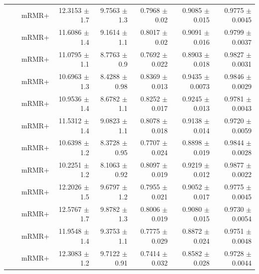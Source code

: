 \begin{longtable}{llp{}rrrrr}
 &  & mRMR+ & 12.3153 {\scriptsize $\pm$ 1.7} & 9.7563 {\scriptsize $\pm$ 1.3} & 0.7968 {\scriptsize $\pm$ 0.02} & 0.9085 {\scriptsize $\pm$ 0.015} & 0.9775 {\scriptsize $\pm$ 0.0045} \\
 &  & mRMR+ & 11.6086 {\scriptsize $\pm$ 1.4} & 9.1614 {\scriptsize $\pm$ 1.1} & 0.8017 {\scriptsize $\pm$ 0.02} & 0.9091 {\scriptsize $\pm$ 0.016} & 0.9799 {\scriptsize $\pm$ 0.0037} \\
 &  & mRMR+ & 11.0795 {\scriptsize $\pm$ 1.1} & 8.7763 {\scriptsize $\pm$ 0.9} & 0.7692 {\scriptsize $\pm$ 0.022} & 0.8903 {\scriptsize $\pm$ 0.018} & 0.9827 {\scriptsize $\pm$ 0.0031} \\
 &  & mRMR+ & 10.6963 {\scriptsize $\pm$ 1.3} & 8.4288 {\scriptsize $\pm$ 0.98} & 0.8369 {\scriptsize $\pm$ 0.013} & 0.9435 {\scriptsize $\pm$ 0.0073} & 0.9846 {\scriptsize $\pm$ 0.0029} \\
 &  & mRMR+ & 10.9536 {\scriptsize $\pm$ 1.4} & 8.6782 {\scriptsize $\pm$ 1.1} & 0.8252 {\scriptsize $\pm$ 0.017} & 0.9245 {\scriptsize $\pm$ 0.013} & 0.9781 {\scriptsize $\pm$ 0.0043} \\
 &  & mRMR+ & 11.5312 {\scriptsize $\pm$ 1.4} & 9.0823 {\scriptsize $\pm$ 1.1} & 0.8078 {\scriptsize $\pm$ 0.018} & 0.9138 {\scriptsize $\pm$ 0.014} & 0.9720 {\scriptsize $\pm$ 0.0059} \\
 &  & mRMR+ & 10.6398 {\scriptsize $\pm$ 1.2} & 8.3728 {\scriptsize $\pm$ 0.95} & 0.7707 {\scriptsize $\pm$ 0.024} & 0.8898 {\scriptsize $\pm$ 0.019} & 0.9844 {\scriptsize $\pm$ 0.0028} \\
 &  & mRMR+ & 10.2251 {\scriptsize $\pm$ 1.2} & 8.1063 {\scriptsize $\pm$ 0.92} & 0.8097 {\scriptsize $\pm$ 0.019} & 0.9219 {\scriptsize $\pm$ 0.012} & 0.9877 {\scriptsize $\pm$ 0.0022} \\
 &  & mRMR+ & 12.2026 {\scriptsize $\pm$ 1.5} & 9.6797 {\scriptsize $\pm$ 1.2} & 0.7955 {\scriptsize $\pm$ 0.021} & 0.9052 {\scriptsize $\pm$ 0.017} & 0.9775 {\scriptsize $\pm$ 0.0045} \\
 &  & mRMR+ & 12.5767 {\scriptsize $\pm$ 1.7} & 9.8782 {\scriptsize $\pm$ 1.3} & 0.8006 {\scriptsize $\pm$ 0.019} & 0.9080 {\scriptsize $\pm$ 0.015} & 0.9730 {\scriptsize $\pm$ 0.0054} \\
 &  & mRMR+ & 11.9548 {\scriptsize $\pm$ 1.4} & 9.3753 {\scriptsize $\pm$ 1.1} & 0.7775 {\scriptsize $\pm$ 0.029} & 0.8872 {\scriptsize $\pm$ 0.024} & 0.9751 {\scriptsize $\pm$ 0.0048} \\
 &  & mRMR+ & 12.3083 {\scriptsize $\pm$ 1.2} & 9.7122 {\scriptsize $\pm$ 0.91} & 0.7414 {\scriptsize $\pm$ 0.032} & 0.8582 {\scriptsize $\pm$ 0.028} & 0.9728 {\scriptsize $\pm$ 0.0044} \\

\end{longtable}
